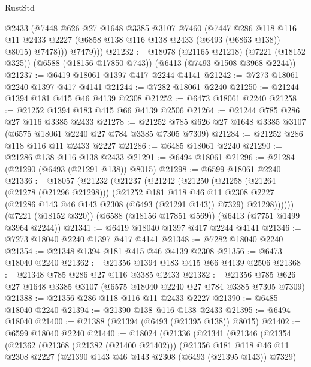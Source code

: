 \begin{lexlean}{RustStd}
\begin{coremodule}
            @2433
            (@7448
              @626
              @27
              @1648
              @3385
              @3107
              @7460
              (@7447
                @286
                @118
                @116
                @11
                @2433
                @2227
                (@6858 @138 @116 @138 @2433 (@6493 (@6863 @138)) @8015)
                @7478)))
          @7479)))
@21232 := @18078
    (@21165 @21218)
    (@7221 (@18152 @325))
    (@6588 (@18156 @17850 @743))
    (@6413 (@7493 @1508 @3968 @2244))
@21237 := @6419 @18061 @1397 @417 @2244 @4141
@21242 := @7273 @18061 @2240 @1397 @417 @4141
@21244 := @7282 @18061 @2240
@21250 := @21244 @1394 @181 @415 @46 @4139 @2308
@21252 := @6473 @18061 @2240
@21258 := @21252 @1394 @183 @415 @66 @4139 @2506
@21264 := @21244 @785 @286 @27 @116 @3385 @2433
@21278 := @21252 @785 @626 @27 @1648 @3385 @3107 (@6575 @18061 @2240 @27 @784 @3385 @7305 @7309)
@21284 := @21252 @286 @118 @116 @11 @2433 @2227
@21286 := @6485 @18061 @2240
@21290 := @21286 @138 @116 @138 @2433
@21291 := @6494 @18061
@21296 := @21284 (@21290 (@6493 (@21291 @138)) @8015)
@21298 := @6599 @18061 @2240
@21336 := @18057
    (@21232
      (@21237
        (@21242
          (@21250
            (@21258
              (@21264 (@21278 (@21296 @21298)))
              (@21252
                @181
                @118
                @46
                @11
                @2308
                @2227
                (@21286 @143 @46 @143 @2308 (@6493 (@21291 @143)) @7329)
                @21298))))))
    (@7221 (@18152 @320))
    (@6588 (@18156 @17851 @569))
    (@6413 (@7751 @1499 @3964 @2244))
@21341 := @6419 @18040 @1397 @417 @2244 @4141
@21346 := @7273 @18040 @2240 @1397 @417 @4141
@21348 := @7282 @18040 @2240
@21354 := @21348 @1394 @181 @415 @46 @4139 @2308
@21356 := @6473 @18040 @2240
@21362 := @21356 @1394 @183 @415 @66 @4139 @2506
@21368 := @21348 @785 @286 @27 @116 @3385 @2433
@21382 := @21356 @785 @626 @27 @1648 @3385 @3107 (@6575 @18040 @2240 @27 @784 @3385 @7305 @7309)
@21388 := @21356 @286 @118 @116 @11 @2433 @2227
@21390 := @6485 @18040 @2240
@21394 := @21390 @138 @116 @138 @2433
@21395 := @6494 @18040
@21400 := @21388 (@21394 (@6493 (@21395 @138)) @8015)
@21402 := @6599 @18040 @2240
@21440 := @18024
    (@21336
      (@21341
        (@21346
          (@21354
            (@21362
              (@21368 (@21382 (@21400 @21402)))
              (@21356
                @181
                @118
                @46
                @11
                @2308
                @2227
                (@21390 @143 @46 @143 @2308 (@6493 (@21395 @143)) @7329)

\end{coremodule}
\end{lexlean}
